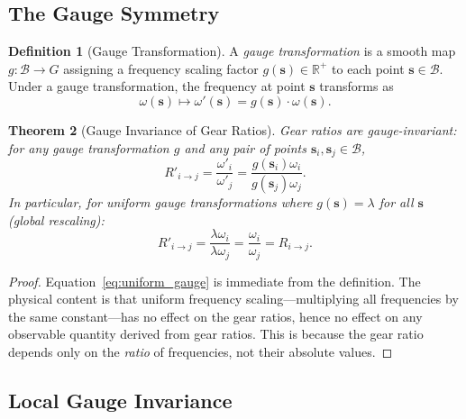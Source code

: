 \documentclass[11pt,twocolumn,a4paper]{article}
\newtheorem{theorem}{Theorem}[section]
\theoremstyle{definition}
\newtheorem{definition}[theorem]{Definition}
\newcommand{\R}{\mathbb{R}}
\newcommand{\Bsp}{\mathcal{B}}
\newcommand{\Rij}{R_{i \to j}}
\begin{document}
\subsection{The Gauge Symmetry}\label{sec:gauge:symmetry}

\begin{definition}[Gauge Transformation]\label{def:gauge_transform}
A \emph{gauge transformation} is a smooth map $g: \Bsp \to G$ assigning a frequency
scaling factor $g(\mathbf{s}) \in \R^+$ to each point $\mathbf{s} \in \Bsp$. Under a
gauge transformation, the frequency at point $\mathbf{s}$ transforms as
\begin{equation}\label{eq:gauge_transform_freq}
  \omega(\mathbf{s}) \mapsto \omega'(\mathbf{s}) = g(\mathbf{s}) \cdot \omega(\mathbf{s}).
\end{equation}
\end{definition}

\begin{theorem}[Gauge Invariance of Gear Ratios]\label{thm:gauge_invariance}
Gear ratios are gauge-invariant: for any gauge transformation $g$ and any pair of
points $\mathbf{s}_i, \mathbf{s}_j \in \Bsp$,
\begin{equation}\label{eq:gauge_invariance}
  R'_{i \to j} = \frac{\omega'_i}{\omega'_j}
  = \frac{g(\mathbf{s}_i) \omega_i}{g(\mathbf{s}_j) \omega_j}.
\end{equation}
In particular, for \emph{uniform} gauge transformations where $g(\mathbf{s}) = \lambda$
for all $\mathbf{s}$ (global rescaling):
\begin{equation}\label{eq:uniform_gauge}
  R'_{i \to j} = \frac{\lambda \omega_i}{\lambda \omega_j} = \frac{\omega_i}{\omega_j}
  = \Rij.
\end{equation}
\end{theorem}

\begin{proof}
Equation~\eqref{eq:uniform_gauge} is immediate from the definition. The physical content
is that uniform frequency scaling---multiplying all frequencies by the same constant---has
no effect on the gear ratios, hence no effect on any observable quantity derived from
gear ratios. This is because the gear ratio depends only on the \emph{ratio} of
frequencies, not their absolute values.
\end{proof}

\subsection{Local Gauge Invariance}\label{sec:gauge:local}
\end{document}

